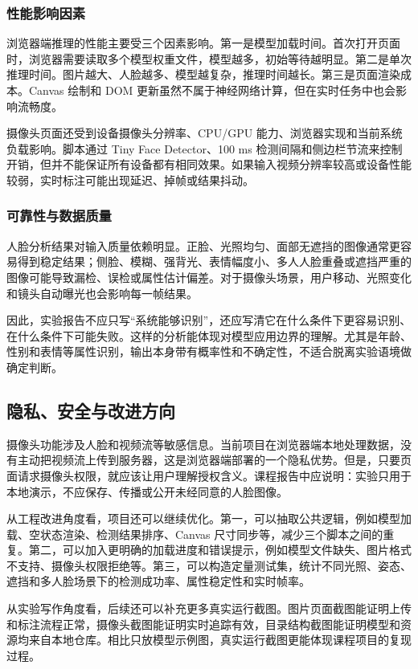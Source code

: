 \subsubsection{性能影响因素}

浏览器端推理的性能主要受三个因素影响。第一是模型加载时间。首次打开页面时，浏览器需要读取多个模型权重文件，模型越多，初始等待越明显。第二是单次推理时间。图片越大、人脸越多、模型越复杂，推理时间越长。第三是页面渲染成本。Canvas 绘制和 DOM 更新虽然不属于神经网络计算，但在实时任务中也会影响流畅度。

摄像头页面还受到设备摄像头分辨率、CPU/GPU 能力、浏览器实现和当前系统负载影响。脚本通过 Tiny Face Detector、100 ms 检测间隔和侧边栏节流来控制开销，但并不能保证所有设备都有相同效果。如果输入视频分辨率较高或设备性能较弱，实时标注可能出现延迟、掉帧或结果抖动。

\subsubsection{可靠性与数据质量}

人脸分析结果对输入质量依赖明显。正脸、光照均匀、面部无遮挡的图像通常更容易得到稳定结果；侧脸、模糊、强背光、表情幅度小、多人人脸重叠或遮挡严重的图像可能导致漏检、误检或属性估计偏差。对于摄像头场景，用户移动、光照变化和镜头自动曝光也会影响每一帧结果。

因此，实验报告不应只写“系统能够识别”，还应写清它在什么条件下更容易识别、在什么条件下可能失败。这样的分析能体现对模型应用边界的理解。尤其是年龄、性别和表情等属性识别，输出本身带有概率性和不确定性，不适合脱离实验语境做确定判断。

\subsection{隐私、安全与改进方向}

摄像头功能涉及人脸和视频流等敏感信息。当前项目在浏览器端本地处理数据，没有主动把视频流上传到服务器，这是浏览器端部署的一个隐私优势。但是，只要页面请求摄像头权限，就应该让用户理解授权含义。课程报告中应说明：实验只用于本地演示，不应保存、传播或公开未经同意的人脸图像。

从工程改进角度看，项目还可以继续优化。第一，可以抽取公共逻辑，例如模型加载、空状态渲染、检测结果排序、Canvas 尺寸同步等，减少三个脚本之间的重复。第二，可以加入更明确的加载进度和错误提示，例如模型文件缺失、图片格式不支持、摄像头权限拒绝等。第三，可以构造定量测试集，统计不同光照、姿态、遮挡和多人脸场景下的检测成功率、属性稳定性和实时帧率。

从实验写作角度看，后续还可以补充更多真实运行截图。图片页面截图能证明上传和标注流程正常，摄像头截图能证明实时追踪有效，目录结构截图能证明模型和资源均来自本地仓库。相比只放模型示例图，真实运行截图更能体现课程项目的复现过程。


